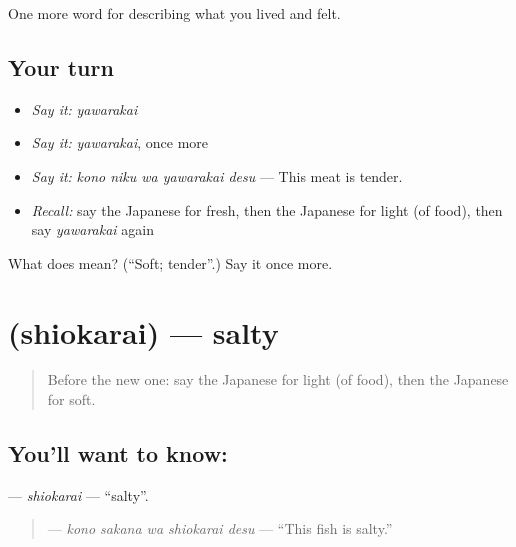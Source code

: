 \begin{grammarlens}[title={What you've built}]
One more word for describing what you lived and felt.
\end{grammarlens}

\subsection*{Your turn}
\begin{itemize}
\raggedright
  \item \emph{Say it:} \emph{yawarakai}
  \item \emph{Say it:} \emph{yawarakai}, once more
  \item \emph{Say it:} \emph{kono niku wa yawarakai desu} — This meat is tender.
  \item \emph{Recall:} say the Japanese for fresh, then the Japanese for light (of food), then say \emph{yawarakai} again
\end{itemize}

\begin{tcolorbox}[breakable,colback=teal!4,colframe=teal!35!black,title={Before you move on}]
What does  mean? (\textquotedblleft{}Soft; tender\textquotedblright{}.) Say it once more.
\end{tcolorbox}
\section[\texorpdfstring{\ja{しおからい} (shiokarai)}{しおからい (shiokarai)}]{ (shiokarai) — salty}

\label{lesson:JA-C496-shiokarai}



\begin{quote}
Before the new one: say the Japanese for light (of food), then the Japanese for soft.
\end{quote}

\subsection*{You'll want to know: }
\textbf{} — \emph{shiokarai} — \textquotedblleft{}salty\textquotedblright{}.

\begin{quote}
\textbf{  } — \emph{kono sakana wa shiokarai desu} — \textquotedblleft{}This fish is salty.\textquotedblright{}
\end{quote}

